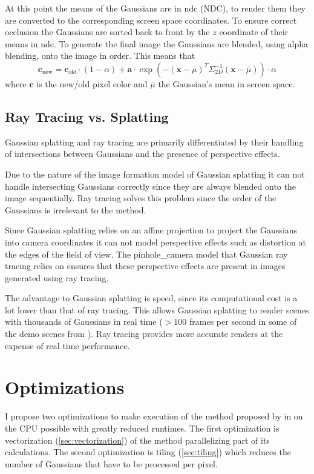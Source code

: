 \documentclass[a4paper, 11pt]{memoir}
\begin{document}
    At this point the means of the Gaussians are in \gls{ndc} (NDC), to render them they are converted to the corresponding
    screen space coordinates. To ensure correct occlusion the Gaussians are sorted back to front by the $z$ coordinate of
    their means in \gls{ndc}. To generate the final image the Gaussians are blended, using alpha blending, onto the image
    in order. This means that
    \begin{equation}
        \mathbf{c}_{\text{new}} = \mathbf{c}_{\text{old}} \cdot (1 - \alpha) + \mathbf{a} \cdot \exp{\left(-(\mathbf{x} - \bar{\mu})^T\Sigma_{2D}^{-1}(\mathbf{x} - \bar{\mu})\right)} \cdot \alpha
    \end{equation}
    where $\mathbf{c}$ is the new/old pixel color and $\bar{\mu}$ the Gaussian's mean in screen space.

    \section{Ray Tracing vs. Splatting}
    \label{sec:ray_v_splat}
    Gaussian splatting and ray tracing are primarily differentiated by their handling of intersections between Gaussians
    and the presence of perspective effects.

    Due to the nature of the image formation model of Gaussian splatting it can not handle intersecting Gaussians correctly
    since they are always blended onto the image sequentially. Ray tracing solves this problem since the order of the
    Gaussians is irrelevant to the method.

    Since Gaussian splatting relies on an affine projection to project the Gaussians into camera coordinates it can not
    model perspective effects such as distortion at the edges of the field of view. The \gls{pinhole_camera} model that
    Gaussian ray tracing relies on ensures that these perspective effects are present in images generated using ray
    tracing.

    The advantage to Gaussian splatting is speed, since its computational cost is a lot lower than that of ray tracing.
    This allows Gaussian splatting to render scenes with thousands of Gaussians in real time ($>100$ frames per second
    in some of the demo scenes from \cite{kerbl3Dgaussians}). Ray tracing provides more accurate renders at the expense
    of real time performance.

    \chapter{Optimizations}
    \label{ch:optimizations}
    I propose two optimizations to make execution of the method proposed by \citeauthor{Rhodin:2015}
    in \cite{Rhodin:2015} on the CPU possible with greatly reduced runtimes.
    The first optimization is vectorization (\ref{sec:vectorization}) of the method
    parallelizing part of its calculations.
    The second optimization is tiling (\ref{sec:tiling}) which reduces the number of Gaussians
    that have to be processed per pixel.
\end{document}
